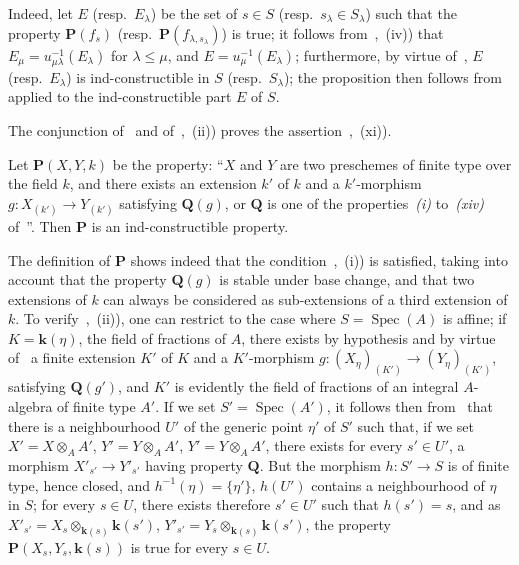 Indeed, let $E$ (resp.\ $E_\lambda$) be the set of $s\in S$ (resp.\ $s_\lambda\in S_\lambda$) such that the property $\mathbf{P}(f_s)$ (resp.\ $\mathbf{P}(f_{\lambda,s_\lambda})$) is true; it follows from~,~(iv)) that $E_\mu=u_{\mu\lambda}^{-1}(E_\lambda)$ for $\lambda\leqslant\mu$, and $E=u_\mu^{-1}(E_\lambda)$; furthermore, by virtue of~, $E$ (resp.\ $E_\lambda$) is ind-constructible in $S$ (resp.\ $S_\lambda$); the proposition then follows from~ applied to the ind-constructible part $E$ of $S$.

\begin{remark}[9.3.4]
\label{IV.9.3.4}
The conjunction of~ and of~,~(ii)) proves the assertion~,~(xi)).
\end{remark}

\begin{proposition}[9.3.5]
\label{IV.9.3.5}
Let $\mathbf{P}(X,Y,k)$ be the property: ``$X$ and $Y$ are two preschemes of finite type over the field $k$, and there exists an extension $k'$ of $k$ and a $k'$-morphism $g:X_{(k')}\to Y_{(k')}$ satisfying $\mathbf{Q}(g)$, or $\mathbf{Q}$ is one of the properties~\emph{(i)} to~\emph{(xiv)} of~''.
Then $\mathbf{P}$ is an ind-constructible property.
\end{proposition}

The definition of $\mathbf{P}$ shows indeed that the condition~,~(i)) is satisfied, taking into account that the property $\mathbf{Q}(g)$ is stable under base change, and that two extensions of $k$ can always be considered as sub-extensions of a third extension of $k$.
To verify~,~(ii)), one can restrict to the case where $S=\operatorname{Spec}(A)$ is affine; if $K=\mathbf{k}(\eta)$, the field of fractions of $A$, there exists by hypothesis and by virtue of~ a finite extension $K'$ of $K$ and a $K'$-morphism $g:(X_\eta)_{(K')}\to(Y_\eta)_{(K')}$, satisfying $\mathbf{Q}(g')$, and $K'$ is evidently the field of fractions of an integral $A$-algebra of finite type $A'$.
If we set $S'=\operatorname{Spec}(A')$, it follows then from~ that there is a neighbourhood $U'$ of the generic point $\eta'$ of $S'$ such that, if we set $X'=X\otimes_A A'$, $Y'=Y\otimes_A A'$, $Y'=Y\otimes_A A'$, there exists for every $s'\in U'$, a morphism $X'_{s'}\to Y'_{s'}$ having property $\mathbf{Q}$.
But the morphism $h:S'\to S$ is of finite type, hence closed, and $h^{-1}(\eta)=\{\eta'\}$, $h(U')$ contains a neighbourhood of $\eta$ in $S$; for every $s\in U$, there exists therefore $s'\in U'$ such that $h(s')=s$, and as $X'_{s'}=X_s\otimes_{\mathbf{k}(s)}\mathbf{k}(s')$, $Y'_{s'}=Y_s\otimes_{\mathbf{k}(s)}\mathbf{k}(s')$, the property $\mathbf{P}(X_s,Y_s,\mathbf{k}(s))$ is true for every $s\in U$.


